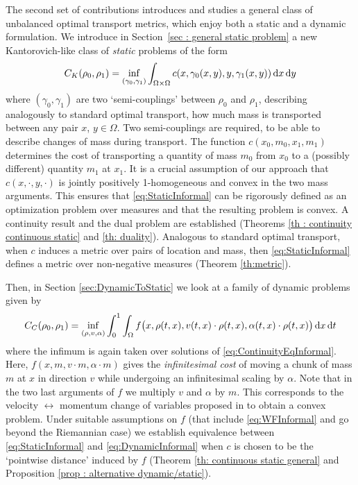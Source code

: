 The second set of contributions introduces and studies a general class of unbalanced optimal transport metrics, which enjoy both a static and a dynamic formulation. 
%
We introduce in Section~\ref{sec : general static problem} a new Kantorovich-like class of \emph{static} problems of the form
\begin{align}
	\label{eq:StaticInformal}
	C_K(\rho_0,\rho_1) = \inf_{(\gamma_0,\gamma_1)} \int_{\Omega \times \Omega} c(x,\gamma_0(x,y),y,\gamma_1(x,y))\,\mathrm{d} x\,\mathrm{d} y
\end{align}
where $(\gamma_0,\gamma_1)$ are two `semi-couplings' between $\rho_0$ and $\rho_1$, describing analogously to standard optimal transport, how much mass is transported between any pair $x$, $y \in \Omega$. Two semi-couplings are required, to be able to describe changes of mass during transport. The function $c(x_0,m_0,x_1,m_1)$ determines the cost of transporting a quantity of mass $m_0$ from $x_0$ to a (possibly different) quantity $m_1$ at $x_1$.
It is a crucial assumption of our approach that $c(x,\cdot,y,\cdot)$ is jointly positively 1-homogeneous and convex in the two mass arguments. This ensures that \eqref{eq:StaticInformal} can be rigorously defined as an optimization problem over measures and that the resulting problem is convex.
A continuity result and the dual problem are established (Theorems \ref{th : continuity continuous static} and \ref{th: duality}).
Analogous to standard optimal transport, when $c$ induces a metric over pairs of location and mass, then \eqref{eq:StaticInformal} defines a metric over non-negative measures (Theorem \ref{th:metric}).

Then, in Section \ref{sec:DynamicToStatic} we look at a family of dynamic problems given by
\begin{align}
	\label{eq:DynamicInformal}
	C_C(\rho_0,\rho_1) = \inf_{(\rho,v,\alpha)} \int_0^1 \int_{\Omega} f\big(x,\rho(t,x),v(t,x) \cdot \rho(t,x), \alpha(t,x) \cdot \rho(t,x) \big)\,\mathrm{d} x\,\mathrm{d} t
\end{align}
where the infimum is again taken over solutions of \eqref{eq:ContinuityEqInformal}. Here, $f(x,m,v \cdot m, \alpha \cdot m)$ gives the \emph{infinitesimal cost} of moving a chunk of mass $m$ at $x$ in direction $v$ while undergoing an infinitesimal scaling by $\alpha$.
%
Note that in the two last arguments of $f$ we multiply $v$ and $\alpha$ by $m$. This corresponds to the velocity $\leftrightarrow$ momentum change of variables proposed in \cite{benamou2000computational} to obtain a convex problem.
%
Under suitable assumptions on $f$ (that include \eqref{eq:WFInformal} and go beyond the Riemannian case) we establish equivalence between \eqref{eq:StaticInformal} and \eqref{eq:DynamicInformal} when $c$ is chosen to be the `pointwise distance' induced by $f$ (Theorem \ref{th: continuous static general} and Proposition \ref{prop : alternative dynamic/static}).

